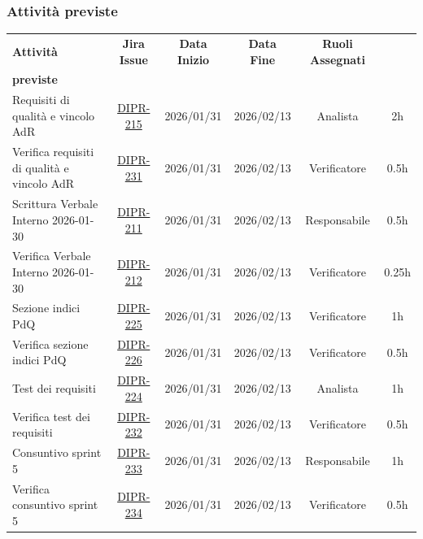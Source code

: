 \documentclass[a4paper,12pt]{article}
\begin{document}
\subsubsection{Attività previste}
\small
{}
    \begin{longtable}{|p{4cm}|c|c|c|c|c|}
        \hline
        \rowcolor{zpusgreen!30}
        \textbf{Attività} & \textbf{Jira Issue} & \textbf{Data Inizio} & \textbf{Data Fine} & \textbf{Ruoli Assegnati} & \begin{tabular}[c]{@{}c@{}} \textbf{Ore} \\ \textbf{previste} \end{tabular} \\
        \hline
        Requisiti di qualità e vincolo AdR & \href{https://7zpus.atlassian.net/browse/DIPR-215}{DIPR-215} & 2026/01/31 & 2026/02/13 & Analista & 2h \\
        \hline
        Verifica requisiti di qualità e vincolo AdR & \href{https://7zpus.atlassian.net/browse/DIPR-231}{DIPR-231} & 2026/01/31 & 2026/02/13 & Verificatore & 0.5h \\
        \hline
        Scrittura Verbale Interno 2026-01-30 & \href{https://7zpus.atlassian.net/browse/DIPR-211}{DIPR-211} & 2026/01/31 & 2026/02/13 & Responsabile & 0.5h \\
        \hline
        Verifica Verbale Interno 2026-01-30 & \href{https://7zpus.atlassian.net/browse/DIPR-212}{DIPR-212} & 2026/01/31 & 2026/02/13 & Verificatore & 0.25h \\
        \hline
        Sezione indici PdQ & \href{https://7zpus.atlassian.net/browse/DIPR-225}{DIPR-225} & 2026/01/31 & 2026/02/13 & Verificatore & 1h \\
        \hline
        Verifica sezione indici PdQ & \href{https://7zpus.atlassian.net/browse/DIPR-226}{DIPR-226} & 2026/01/31 & 2026/02/13 & Verificatore & 0.5h \\
        \hline
        Test dei requisiti & \href{https://7zpus.atlassian.net/browse/DIPR-224}{DIPR-224} & 2026/01/31 & 2026/02/13 & Analista & 1h \\
        \hline
        Verifica test dei requisiti & \href{https://7zpus.atlassian.net/browse/DIPR-232}{DIPR-232} & 2026/01/31 & 2026/02/13 & Verificatore & 0.5h \\
        \hline
        Consuntivo sprint 5 & \href{https://7zpus.atlassian.net/browse/DIPR-233}{DIPR-233} & 2026/01/31 & 2026/02/13 & Responsabile & 1h \\
        \hline
        Verifica consuntivo sprint 5 & \href{https://7zpus.atlassian.net/browse/DIPR-234}{DIPR-234} & 2026/01/31 & 2026/02/13 & Verificatore & 0.5h \\

\end{longtable}
\end{document}
